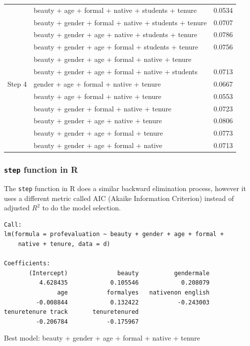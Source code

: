 \begin{frame}[shrink]
{\begin{tabular}{l | l | c}
		& beauty + age + formal + native + students + tenure					& 0.0534 \\
		& beauty + gender + formal + native + students + tenure					& 0.0707 \\
		& beauty + gender + age + native + students + tenure					& 0.0786 \\
		& beauty + gender + age + formal + students + tenure					& 0.0756 \\
		& beauty + gender + age + formal + native + tenure						& \orange{0.0855} \\
		& beauty + gender + age + formal + native + students					& 0.0713 \pause \\
\hline
Step 4	& gender + age + formal + native + tenure 							& 0.0667 \\
		& beauty + age + formal + native + tenure								& 0.0553 \\
		& beauty + gender + formal + native + tenure							& 0.0723 \\
		& beauty + gender + age + native + tenure							& 0.0806 \\
		& beauty + gender + age + formal + tenure							& 0.0773 \\
		& beauty + gender + age + formal + native							& 0.0713 \\
\end{tabular}
}

\end{frame}


\begin{frame}[fragile]
\frametitle{\texttt{step} function in R}

The \texttt{step} function in R does a similar backward elimination process, 
however it uses a different metric called AIC (Akaike Information Criterion) 
instead of adjusted $R^2$ to do the model selection.

{\tiny
\begin{verbatim}
Call:
lm(formula = profevaluation ~ beauty + gender + age + formal + 
    native + tenure, data = d)

Coefficients:
       (Intercept)              beauty          gendermale  
          4.628435            0.105546            0.208079  
               age           formalyes   nativenon english  
         -0.008844            0.132422           -0.243003  
tenuretenure track       tenuretenured  
         -0.206784           -0.175967  
\end{verbatim}
}

\pause
Best model: beauty + gender + age + formal + native + tenure

\end{frame}

